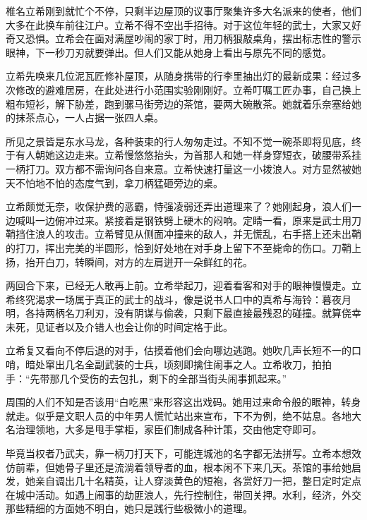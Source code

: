 \documentclass{article}
\begin{document}
椎名立希刚到就忙个不停，只剩半边屋顶的议事厅聚集许多大名派来的使者，他们大多在此换车前往江户。立希不得不空出手招待。对于这位年轻的武士，大家又好奇又恐惧。立希会在面对满屋吵闹的家丁时，用刀柄狠敲桌角，摆出标志性的警示眼神，下一秒刀刃就要弹出。但人们又能从她身上看出与原先不同的感觉。



立希先唤来几位泥瓦匠修补屋顶，从随身携带的行李里抽出灯的最新成果：经过多次修改的避难居房，在此处进行小范围实验刚刚好。立希叮嘱工匠办事，自己换上粗布短衫，解下胁差，跑到骡马街旁边的茶馆，要两大碗散茶。她就着乐奈塞给她的抹茶点心，一人占据一张四人桌。



所见之景皆是东水马龙，各种装束的行人匆匆走过。不知不觉一碗茶即将见底，终于有人朝她这边走来。立希慢悠悠抬头，为首那人和她一样身穿短衣，破腰带系挂一柄打刀。双方都不需询问各自来意。立希快速打量这一小拨浪人。对方显然被她天不怕地不怕的态度气到，拿刀柄猛砸旁边的桌。



立希颇觉无奈，收保护费的恶霸，恃强凌弱还弄出道理来了？她刚起身，浪人们一边喊叫一边俯冲过来。紧接着是钢铁劈上硬木的闷响。定睛一看，原来是武士用刀鞘挡住浪人的攻击。立希臂见从侧面冲撞来的敌人，并无慌乱，右手搭上还未出鞘的打刀，挥出完美的半圆形，恰到好处地在对手身上留下不至毙命的伤口。刀鞘上扬，抬开白刀，转瞬间，对方的左肩迸开一朵鲜红的花。



两回合下来，已经无人敢再上前。立希举起刀，迎着看客和对手的眼神慢慢走。立希终究渴求一场属于真正的武士的战斗，像是说书人口中的真希与海铃：暮夜月明，各持两柄名刀利刃，没有阴谋与偷袭，只剩下最直接最残忍的碰撞。就算侥幸未死，见证者以及介错人也会让你的时间定格于此。



立希复又看向不停后退的对手，估摸着他们会向哪边逃跑。她吹几声长短不一的口哨，暗处窜出几名全副武装的士兵，顷刻即擒住闹事之人。立希收刀，拍拍手：“先带那几个受伤的去包扎，剩下的全部当街头闹事抓起来。”



周围的人们不知是否该用“白吃黑”来形容这出戏码。她用过来命令般的眼神，转身就走。似乎是文职人员的中年男人慌忙站出来宣布，下不为例，绝不姑息。各地大名治理领地，大多是甩手掌柜，家臣们制成各种计策，交由他定夺即可。



毕竟当权者乃武夫，靠一柄刀打天下，可能连城池的名字都无法拼写。立希本想效仿前辈，但她骨子里还是流淌着领导者的血，根本闲不下来几天。茶馆的事给她启发，她亲自调出几十名精英，让人穿淡黄色的短袍，各赏好刀一把，整日定时定点在城中活动。如遇上闹事的劫匪浪人，先行控制住，带回关押。水利，经济，外交那些精细的方面她不明白，她只是践行些极微小的道理。
\end{document}
